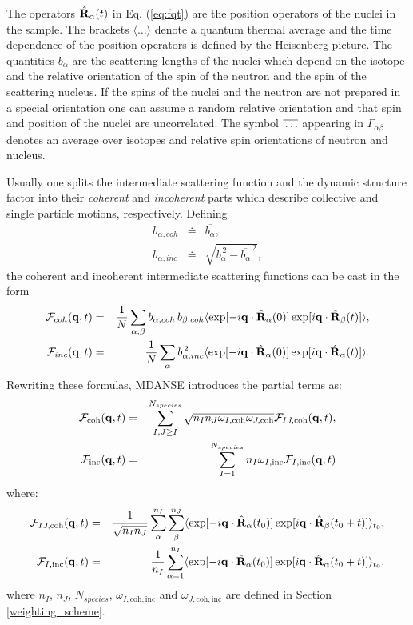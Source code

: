\documentclass[a4paper,11pt]{article}
\begin{document}
The operators $\hat {\bf R}_\alpha(t)$ in Eq. (\ref{eq:fqt}) are the position operators of the nuclei in the sample.
The brackets $\langle\ldots\rangle$ denote a quantum thermal average and the time dependence of the position operators
is defined by the Heisenberg picture.  The quantities $b_\alpha$ are the scattering lengths of the nuclei which depend
on the isotope and the relative orientation of the spin of the neutron and the spin of the scattering nucleus. If the
spins of the nuclei and the neutron are not prepared in a special orientation one can assume a random relative orientation
and that spin and position of the nuclei are uncorrelated. The symbol
$\overline{\rule{0pt}{5pt}\ldots}$ appearing in $\Gamma_{\alpha\beta}$ denotes an average over isotopes and relative spin
orientations of neutron and nucleus.

Usually one splits the intermediate scattering function and the dynamic structure factor into their {\em coherent} and
{\em incoherent} parts which describe collective and single particle motions, respectively.
Defining
\begin{eqnarray}
b_{\alpha,coh} &\doteq &\overline{b_\alpha},\\ b_{\alpha,inc} &\doteq
&\sqrt{ \overline{b_\alpha^{\,2}} - \overline{b_\alpha}^{\,2} },
\end{eqnarray}
the coherent and incoherent intermediate scattering functions can be cast in the form
\begin{eqnarray}
{\cal F}_{coh}({\bf q},t) &= &\frac{1}{N}\sum\limits_{\alpha,\beta}
b_{\alpha,coh}\,b_{\beta,coh}
\langle\exp[-i{\bf q}\cdot\hat{\bf R}_\alpha(0)]
       \exp[i{\bf q}\cdot\hat{\bf R}_\beta(t)]\rangle,\\
{\cal F}_{inc}({\bf q},t) &= &\frac{1}{N}\sum\limits_{\alpha}
b_{\alpha,inc}^{\,2}
\langle\exp[-i{\bf q}\cdot\hat{\bf R}_\alpha(0)]
       \exp[i{\bf q}\cdot\hat{\bf R}_\alpha(t)]\rangle.
\end{eqnarray}
Rewriting these formulas, \gls{MDANSE} introduces the partial terms as:
\begin{eqnarray}
\label{eq:fcoh}
{\cal F}_{\mathrm{coh}}({\bf q},t) &= & \sum\limits^{N_{species}}_{I,J \geq I}\sqrt{n_I n_J\omega_{I,\mathrm{coh}}\omega_{J,\mathrm{coh}}}{\cal F}_{IJ,\mathrm{coh}}({\bf q},t),\\
\label{eq:finc}
{\cal F}_{\mathrm{inc}}({\bf q},t) &= &\sum\limits^{N_{species}}_{I = 1}n_I \omega_{I,\mathrm{inc}}{\cal F}_{I,\mathrm{inc}}({\bf q},t)
\end{eqnarray}
where:
\begin{eqnarray}
{\cal F}_{IJ,\mathrm{coh}}({\bf q},t) &= &\frac{1}{\sqrt{n_In_J}}\sum\limits^{n_I}_{\alpha}\sum\limits^{n_J}_{\beta}
\langle\exp[-i{\bf q}\cdot\hat{\bf R}_\alpha(t_0)]
       \exp[i{\bf q}\cdot\hat{\bf R}_\beta(t_0+t)]\rangle_{t_0},\\
{\cal F}_{I,\mathrm{inc}}({\bf q},t) &= & \frac{1}{n_I}\sum\limits^{n_I}_{\alpha = 1}\langle\exp[-i{\bf q}
\cdot\hat{\bf R}_\alpha(t_0)]\exp[i{\bf q}\cdot\hat{\bf R}_\alpha(t_0+t)]\rangle_{t_0}.
\end{eqnarray}
where $n_I$, $n_J$, $N_{species}$, $\omega_{I,\mathrm{coh,inc}}$ and $\omega_{J,\mathrm{coh,inc}}$ are defined in
Section \ref{weighting_scheme}.
\end{document}
